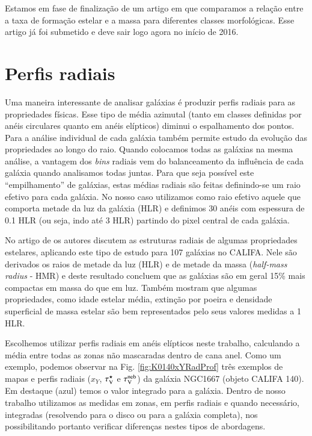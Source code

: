 Estamos em fase de finalização de um artigo em que comparamos a relação entre a taxa de formação
estelar e a massa para diferentes classes morfológicas. Esse artigo já foi submetido e deve sair
logo agora no início de 2016.

\section{Perfis radiais}
\label{sec:amostra:rad}

Uma maneira interessante de analisar galáxias é produzir perfis radiais para as propriedades
físicas. Esse tipo de média azimutal (tanto em classes definidas por anéis circulares quanto em
anéis elípticos) diminui o espalhamento dos pontos. Para a análise individual de cada galáxia também
permite estudo da evolução das propriedades ao longo do raio. Quando colocamos todas as galáxias na
mesma análise, a vantagem dos {\em bins} radiais vem do balanceamento da influência de cada galáxia
quando analisamos todas juntas. Para que seja possível este ``empilhamento'' de galáxias, estas
médias radiais são feitas definindo-se um raio efetivo para cada galáxia. No nosso caso utilizamos
como raio efetivo aquele que comporta metade da luz da galáxia (HLR) e definimos 30 anéis com
espessura de 0.1 HLR (ou seja, indo até 3 HLR) partindo do pixel central de cada galáxia.

No artigo de \citet{GonzalezDelgado.etal.2014a} os autores discutem as estruturas radiais de algumas
propriedades estelares, aplicando este tipo de estudo para 107 galáxias no CALIFA. Nele são
derivados os raios de metade da luz (HLR) e de metade da massa ({\em half-mass radius} - HMR) e
deste resultado concluem que as galáxias são em geral 15\% mais compactas em massa do que em luz.
Também mostram que algumas propriedades, como idade estelar média, extinção por poeira e densidade
superficial de massa estelar são bem representados pelo seus valores medidas a 1 HLR.

Escolhemos utilizar perfis radiais em anéis elípticos neste trabalho, calculando a média entre todas
as zonas não mascaradas dentro de cana anel. Como um exemplo, podemos observar na Fig.
\ref{fig:K0140xYRadProf} três exemplos de mapas e perfis radiais ($x_Y$, $\tau_{\mathrm{V}}^\star$ e $\tau_{\mathrm{V}}^{\mathrm{neb}}$) da
galáxia NGC1667 (objeto CALIFA 140). Em destaque (azul) temos o valor integrado para a galáxia.
Dentro de nosso trabalho utilizamos as medidas em zonas, em perfis radiais e quando necessário,
integradas (resolvendo para o disco ou para a galáxia completa), nos possibilitando portanto
verificar diferenças nestes tipos de abordagens.

